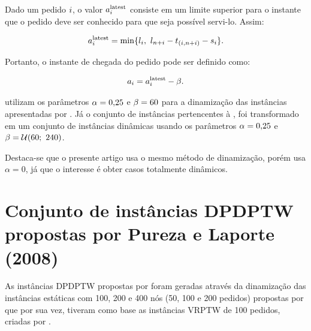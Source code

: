 Dado um pedido $i$, o valor $a{}_{i{}}^{\mathrm{latest}}$  consiste em um
limite superior para o instante que o pedido deve ser conhecido para que seja
possível servi-lo. Assim:

\begin{equation}
    a{}_{i{}}^{\mathrm{latest}} = 
    \min\{l_{i},
    \ l_{n + i}  
    - t_{(i,n + i)} 
    - s_{i}\}.
    \label{eq:berbeglia_hybrid_2012_requestLatestArrivalTime}
\end{equation}

Portanto, o instante de chegada do pedido pode ser definido como:

\begin{equation}
    a_{i} = a{}_{i{}}^{\mathrm{latest}} - \beta.
    \label{eq:berbeglia_hybrid_2012_requestArrivalTime}
\end{equation}


\textcite{berbeglia_hybrid_tabu_2012} utilizam os parâmetros 
$\alpha = 0{,}25$ e $\beta = 60$ para a dinamização das 
instâncias apresentadas por \textcite{ropke_models_2007}.
Já o conjunto de instâncias pertencentes à \textcite{cordeau_tabu_2003}, foi 
transformado em um conjunto de instâncias dinâmicas usando os parâmetros 
$\alpha = 0{,}25$ e $\beta =\mathcal{U}(60;\ 240)$.

Destaca-se que o presente artigo usa o mesmo método de dinamização, porém usa 
$\alpha = 0$, já que o interesse é obter casos totalmente dinâmicos.




\section{Conjunto de instâncias DPDPTW propostas por 
Pureza e Laporte (2008)}
\label{sec:pureza_instances}

As instâncias DPDPTW propostas por \textcite{pureza_laporte_waiting_2008} 
foram geradas através da dinamização das instâncias estáticas com 100, 200 e 
400 nós (50, 100 e 200 pedidos) propostas por 
\textcite{li_metaheuristic_2003} que por sua vez, tiveram como base as 
instâncias VRPTW de 100 pedidos, criadas por 
\textcite{solomon_algorithms_1987}.

